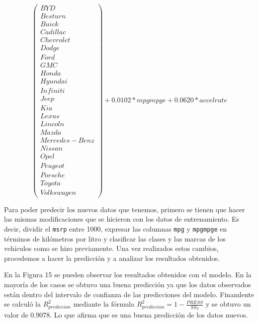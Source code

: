\documentclass[11pt]{article}
\begin{document}
\begin{equation}
\begin{pmatrix}
       BYD \\
       Besturn \\
       Buick \\
       Cadillac \\
       Chevrolet \\
       Dodge \\
       Ford \\
       GMC \\
       Honda \\
       Hyundai \\
       Infiniti \\
       Jeep \\
       Kia \\
       Lexus \\
       Lincoln \\
       Mazda \\
       Mercedes-Benz \\
       Nissan \\
       Opel \\
       Peugeot \\
       Porsche \\
       Toyota \\
       Volkswagen
    \end{pmatrix} + 0.0102*mpgmpge + 0.0620*accelrate
\end{equation}

    Para poder predecir los nuevos datos que tenemos, primero se tienen que
hacer las mismas modificaciones que se hicieron con los datos de
entrenamiento. Es decir, dividir el \texttt{msrp} entre 1000, expresar
las columnas \texttt{mpg} y \texttt{mpgmpge} en términos de kilómetros
por litro y clasificar las clases y las marcas de los vehículos como se
hizo previamente. Una vez realizados estos cambios, procedemos a hacer
la predicción y a analizar los resultados obtenidos.

    \begin{center}
    \end{center}
    
    
    En la Figura 15 se pueden observar los resultados obtenidos con el
modelo. En la mayoría de los casos se obtuvo una buena predicción ya que
los datos observados están dentro del intervalo de confianza de las
predicciones del modelo. Finamlente se calculó la \(R^2_{prediccion}\)
mediante la fórmula \(R^2_{prediccion} = 1 - \frac{PRESS}{SS_T}\) y se
obtuvo un valor de 0.9078. Lo que afirma que es una buena predicción de
los datos nuevos.
\end{document}
